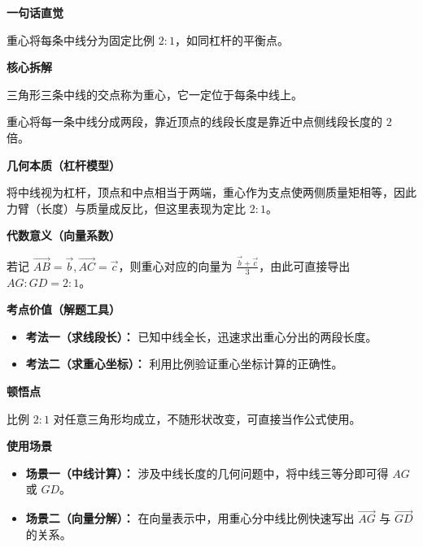 \begin{explanationbox}
	\textbf{\textcolor{CExplanation}{一句话直觉}}

	重心将每条中线分为固定比例 \(2:1\)，如同杠杆的平衡点。

	\medskip
	\textbf{\textcolor{CExplanation}{核心拆解}}
	\begin{description}[style=nextline, leftmargin=2.8em, labelsep=0.5em, itemsep=0.45em]
		\item[\textbf{要点一（重心定义）：}] 三角形三条中线的交点称为重心，它一定位于每条中线上。
		\item[\textbf{要点二（分割比例）：}] 重心将每一条中线分成两段，靠近顶点的线段长度是靠近中点侧线段长度的 \(2\) 倍。
	\end{description}

	\medskip
	\textbf{\textcolor{CExplanation}{几何本质（杠杆模型）}}

	将中线视为杠杆，顶点和中点相当于两端，重心作为支点使两侧质量矩相等，因此力臂（长度）与质量成反比，但这里表现为定比 \(2:1\)。

	\medskip
	\textbf{\textcolor{CExplanation}{代数意义（向量系数）}}

	若记 \(\overrightarrow{AB} = \vec{b}, \overrightarrow{AC} = \vec{c}\)，则重心对应的向量为 \(\frac{\vec{b} + \vec{c}}{3}\)，由此可直接导出 \(AG:GD = 2:1\)。

	\medskip
	\textbf{\textcolor{CExplanation}{考点价值（解题工具）}}
	\begin{itemize}[leftmargin=*, itemsep=0.5em, topsep=0.4em]
		\item \textbf{考法一（求线段长）：} 已知中线全长，迅速求出重心分出的两段长度。
		\item \textbf{考法二（求重心坐标）：} 利用比例验证重心坐标计算的正确性。
	\end{itemize}

	\medskip
	\textbf{\textcolor{CExplanation}{顿悟点}}

	比例 \(2:1\) 对任意三角形均成立，不随形状改变，可直接当作公式使用。

	\medskip
	\textbf{\textcolor{CExplanation}{使用场景}}
	\begin{itemize}[leftmargin=*, itemsep=0.5em, topsep=0.4em]
		\item \textbf{场景一（中线计算）：} 涉及中线长度的几何问题中，将中线三等分即可得 \(AG\) 或 \(GD\)。
		\item \textbf{场景二（向量分解）：} 在向量表示中，用重心分中线比例快速写出 \(\overrightarrow{AG}\) 与 \(\overrightarrow{GD}\) 的关系。
	\end{itemize}
\end{explanationbox}